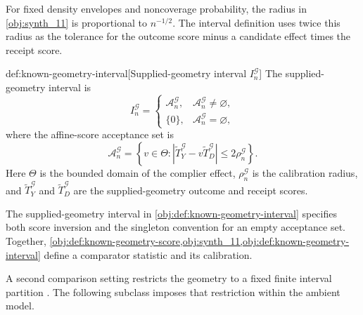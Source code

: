 For fixed density envelopes and noncoverage probability, the radius  in \cref{obj:synth_11} is proportional to \(n^{-1/2}\). The interval definition uses twice this radius as the tolerance for the outcome score minus a candidate effect times the receipt score.

\begin{definitionv}{def:known-geometry-interval}[Supplied-geometry interval $I_n^{\mathcal G}$]
The supplied-geometry interval is
\[
I_n^{\mathcal G}
=
\begin{cases}
\mathcal A_n^{\mathcal G},&\mathcal A_n^{\mathcal G}\ne\varnothing,\\
\{0\},&\mathcal A_n^{\mathcal G}=\varnothing,
\end{cases}
\]
where the affine-score acceptance set is
\[
\mathcal A_n^{\mathcal G}
=
\left\{
v\in\Theta:
\left|\widetilde T_Y^{\mathcal G}
-v\widetilde T_D^{\mathcal G}\right|
\le 2\rho_n^{\mathcal G}
\right\}.
\]
Here \(\Theta\) is the bounded domain of the complier effect, \(\rho_n^{\mathcal G}\) is the calibration radius, and \(\widetilde T_Y^{\mathcal G}\) and \(\widetilde T_D^{\mathcal G}\) are the supplied-geometry outcome and receipt scores.
\end{definitionv}

The supplied-geometry interval  in \cref{obj:def:known-geometry-interval} specifies both score inversion and the singleton convention for an empty acceptance set. Together, \cref{obj:def:known-geometry-score,obj:synth_11,obj:def:known-geometry-interval} define a comparator statistic and its calibration.

A second comparison setting restricts the geometry to a fixed finite interval partition . The following subclass imposes that restriction within the ambient model.

